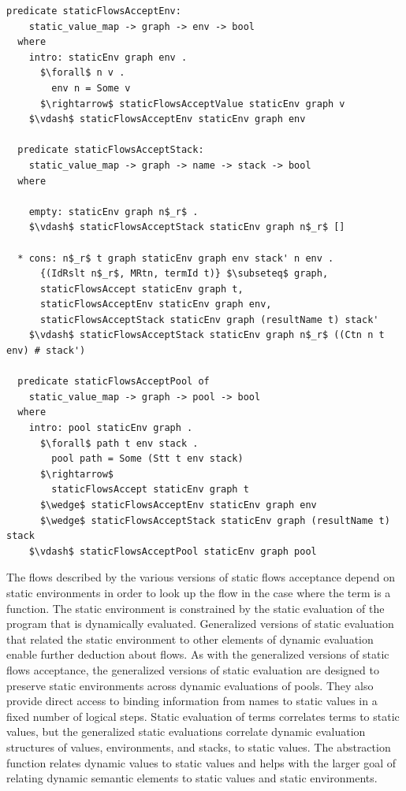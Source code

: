 \documentclass[letterpaper, 11pt]{report}
\begin{document}
\begin{lstlisting}[language=logic, mathescape]
  predicate staticFlowsAcceptEnv:
    static_value_map -> graph -> env -> bool
  where 
    intro: staticEnv graph env .
      $\forall$ n v . 
        env n = Some v
      $\rightarrow$ staticFlowsAcceptValue staticEnv graph v
    $\vdash$ staticFlowsAcceptEnv staticEnv graph env

  predicate staticFlowsAcceptStack:
    static_value_map -> graph -> name -> stack -> bool
  where

    empty: staticEnv graph n$_r$ .
    $\vdash$ staticFlowsAcceptStack staticEnv graph n$_r$ []

  * cons: n$_r$ t graph staticEnv graph env stack' n env .
      {(IdRslt n$_r$, MRtn, termId t)} $\subseteq$ graph,
      staticFlowsAccept staticEnv graph t,
      staticFlowsAcceptEnv staticEnv graph env,
      staticFlowsAcceptStack staticEnv graph (resultName t) stack' 
    $\vdash$ staticFlowsAcceptStack staticEnv graph n$_r$ ((Ctn n t env) # stack')

  predicate staticFlowsAcceptPool of
    static_value_map -> graph -> pool -> bool
  where
    intro: pool staticEnv graph .
      $\forall$ path t env stack .
        pool path = Some (Stt t env stack)
      $\rightarrow$
        staticFlowsAccept staticEnv graph t
      $\wedge$ staticFlowsAcceptEnv staticEnv graph env
      $\wedge$ staticFlowsAcceptStack staticEnv graph (resultName t) stack
    $\vdash$ staticFlowsAcceptPool staticEnv graph pool
\end{lstlisting}

The flows described by the various versions of static flows acceptance depend on static
environments in order to look up the flow in the case where the term is a function.
The static environment is constrained by the static evaluation of the program that is dynamically evaluated.
Generalized versions of static evaluation that related the static environment to other elements of dynamic evaluation
enable further deduction about flows.
As with the generalized versions of static flows acceptance,
the generalized versions of static evaluation are designed to
preserve static environments across dynamic evaluations of pools.
They also provide direct access to binding information from names
to static values in a fixed number of logical steps. Static evaluation of terms correlates
terms to static values, but the generalized static evaluations correlate dynamic
evaluation structures of values, environments, and stacks, to static values.
The abstraction function relates dynamic values to static values and helps with the larger goal of
relating dynamic semantic elements to static values and static environments.   
\end{document}
